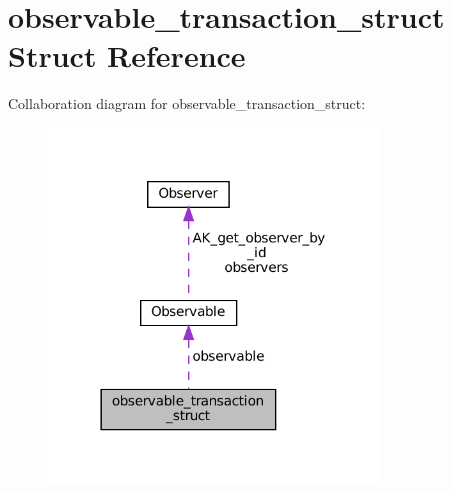 \hypertarget{structobservable__transaction__struct}{}\section{observable\+\_\+transaction\+\_\+struct Struct Reference}
\label{structobservable__transaction__struct}


Collaboration diagram for observable\+\_\+transaction\+\_\+struct\+:\nopagebreak
\begin{figure}[H]
\begin{center}
\leavevmode
\includegraphics[width=249pt]{structobservable__transaction__struct__coll__graph}
\end{center}
\end{figure}
